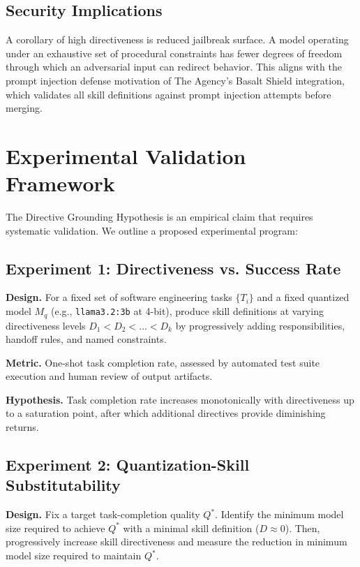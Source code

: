 \documentclass[11pt,a4paper]{article}
\begin{document}
\subsection{Security Implications}

A corollary of high directiveness is reduced jailbreak surface. A model
operating under an exhaustive set of procedural constraints has fewer
degrees of freedom through which an adversarial input can redirect behavior.
This aligns with the prompt injection defense motivation of The Agency's
Basalt Shield integration, which validates all skill definitions against
prompt injection attempts before merging.

\section{Experimental Validation Framework}
\label{sec:future}

The Directive Grounding Hypothesis is an empirical claim that requires
systematic validation. We outline a proposed experimental program:

\subsection{Experiment 1: Directiveness vs. Success Rate}

\textbf{Design.} For a fixed set of software engineering tasks $\{T_i\}$
and a fixed quantized model $M_q$ (e.g., \texttt{llama3.2:3b} at 4-bit),
produce skill definitions at varying directiveness levels
$D_1 < D_2 < \ldots < D_k$ by progressively adding responsibilities,
handoff rules, and named constraints.

\textbf{Metric.} One-shot task completion rate, assessed by automated test
suite execution and human review of output artifacts.

\textbf{Hypothesis.} Task completion rate increases monotonically with
directiveness up to a saturation point, after which additional directives
provide diminishing returns.

\subsection{Experiment 2: Quantization-Skill Substitutability}

\textbf{Design.} Fix a target task-completion quality $Q^*$. Identify the
minimum model size required to achieve $Q^*$ with a minimal skill definition
($D \approx 0$). Then, progressively increase skill directiveness and measure
the reduction in minimum model size required to maintain $Q^*$.
\end{document}
